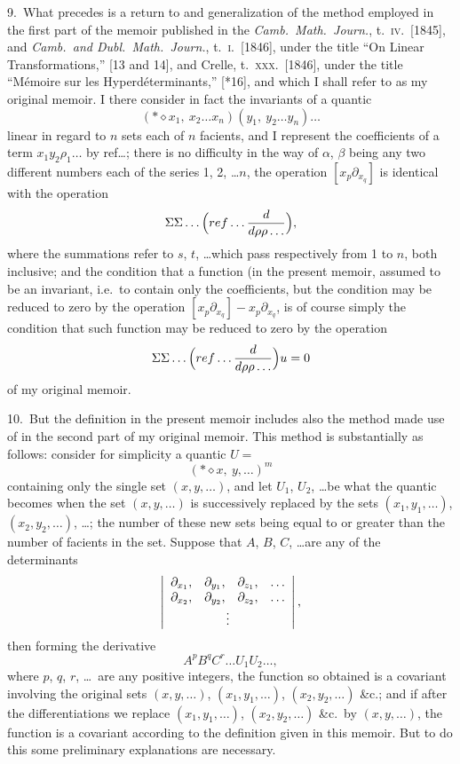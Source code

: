 \documentclass[11pt,a4paper]{article}
\begin{document}
9.\ What precedes is a return to and generalization of the method employed in the first part of the memoir published in the \textit{Camb.\ Math.\ Journ.}, t.\ \textsc{iv.}\ [1845], and \textit{Camb.\ and Dubl.\ Math.\ Journ.}, t.\ \textsc{i.}\ [1846], under the title ``On Linear Transformations,'' [13 and 14], and Crelle, t.\ \textsc{xxx.}\ [1846], under the title ``M\'emoire sur les Hyperd\'eterminants,'' [*16], and which I shall refer to as my original memoir. I there consider in fact the invariants of a quantic
\[
(*\diamond x_1,\ x_2 \ldots x_n)(y_1,\ y_2 \ldots y_n)\ldots
\]
linear in regard to $n$ sets each of $n$ facients, and I represent the coefficients of a term $x_1 y_2 \rho_1 \ldots$ by ref\ldots; there is no difficulty in the way of $\alpha$, $\beta$ being any two different numbers each of the series 1, 2, \ldots $n$, the operation $[x_p\partial_{x_q}]$ is identical with the operation
\[
\Sigma\Sigma\ldots\Bigl(ref\ldots\frac{d}{d\rho\rho\ldots}\Bigr),
\]
where the summations refer to $s$, $t$, \ldots which pass respectively from 1 to $n$, both inclusive; and the condition that a function (in the present memoir, assumed to be an invariant, i.e.\ to contain only the coefficients, but the condition may be reduced to zero by the operation $[x_p\partial_{x_q}] - x_p\partial_{x_q}$, is of course simply the condition that such function may be reduced to zero by the operation
\[
\Sigma\Sigma\ldots\Bigl(ref\ldots\frac{d}{d\rho\rho\ldots}\Bigr) u = 0
\]
of my original memoir.

\medskip

10.\ But the definition in the present memoir includes also the method made use of in the second part of my original memoir. This method is substantially as follows: consider for simplicity a quantic $U =$
\[
(*\diamond x,\ y,\ldots)^m
\]
containing only the single set $(x, y, \ldots)$, and let $U_1$, $U_2$, \ldots be what the quantic becomes when the set $(x, y, \ldots)$ is successively replaced by the sets $(x_1, y_1, \ldots)$, $(x_2, y_2, \ldots)$, \ldots; the number of these new sets being equal to or greater than the number of facients in the set. Suppose that $A$, $B$, $C$, \ldots are any of the determinants
\[
\left\lvert\begin{array}{cccc}
\partial_{x_1}, & \partial_{y_1}, & \partial_{z_1}, & \ldots\\
\partial_{x_2}, & \partial_{y_2}, & \partial_{z_2}, & \ldots\\
\multicolumn{4}{c}{\vdots}
\end{array}\right\rvert,
\]
then forming the derivative
\[
A^p B^q C^r \ldots U_1 U_2 \ldots,
\]
where $p$, $q$, $r$, \ldots\ are any positive integers, the function so obtained is a covariant involving the original sets $(x, y, \ldots)$, $(x_1, y_1, \ldots)$, $(x_2, y_2, \ldots)$ \&c.; and if after the differentiations we replace $(x_1, y_1, \ldots)$, $(x_2, y_2, \ldots)$ \&c.\ by $(x, y, \ldots)$, the function is a covariant according to the definition given in this memoir. But to do this some preliminary explanations are necessary.
\end{document}
